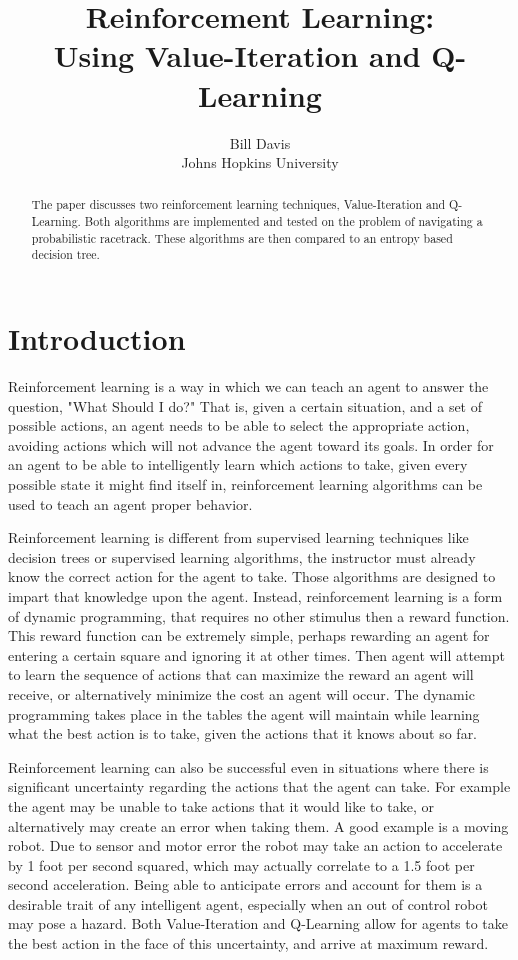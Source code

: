\documentclass[12pt,letterpaper]{article}
\title{Reinforcement Learning: \\Using Value-Iteration and Q-Learning}
\author{Bill Davis \\ Johns Hopkins University}
\begin{document}
\maketitle

\begin{abstract}
The paper discusses two reinforcement learning techniques, Value-Iteration and Q-Learning. Both algorithms are implemented and tested on the problem of navigating a probabilistic racetrack. These algorithms are then compared to an entropy based decision tree.
\end{abstract}

\section{Introduction}
Reinforcement learning is a way in which we can teach an agent to answer the question, "What Should I do?" That is, given a certain situation, and a set of possible actions, an agent needs to be able to select the appropriate action, avoiding actions which will not advance the agent toward its goals. In order for an agent to be able to intelligently learn which actions to take, given every possible state it might find itself in, reinforcement learning algorithms can be used to teach an agent proper behavior. 

Reinforcement learning is different from supervised learning techniques like decision trees or supervised learning algorithms, the instructor must already know the correct action for the agent to take. Those algorithms are designed to impart that knowledge upon the agent. Instead, reinforcement learning is a form of dynamic programming, that requires no other stimulus then a reward function. This reward function can be extremely simple, perhaps rewarding an agent for entering a certain square and ignoring it at other times. Then agent will attempt to learn the sequence of actions that can maximize the reward an agent will receive, or alternatively minimize the cost an agent will occur.  The dynamic programming takes place in the tables the agent will maintain while learning what the best action is to take, given the actions that it knows about so far. 

Reinforcement learning can also be successful even in situations where there is significant uncertainty regarding the actions that the agent can take. For example the agent may be unable to take actions that it would like to take, or alternatively may create an error when taking them. A good example is a moving robot. Due to sensor and motor error the robot may take an action to accelerate by 1 foot per second squared, which may actually correlate to a 1.5 foot per second acceleration. Being able to anticipate errors and account for them is a desirable trait of any intelligent agent, especially when an out of control robot may pose a hazard. Both Value-Iteration and Q-Learning allow for agents to take the best action in the face of this uncertainty, and arrive at maximum reward. 
\end{document}
